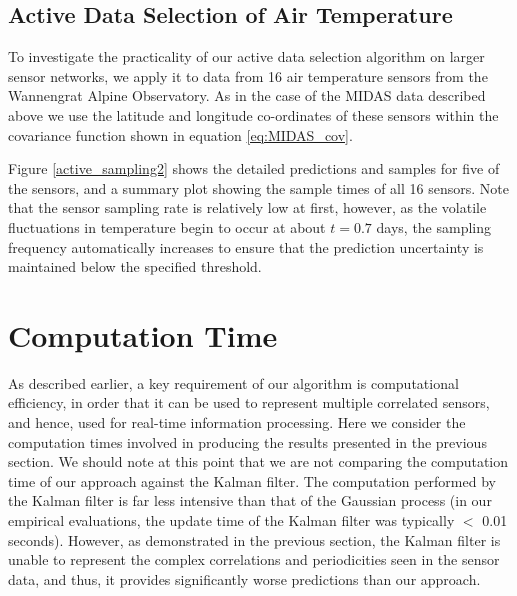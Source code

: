 \documentclass{acmtrans2m}
\begin{document}
\subsection{Active Data Selection of Air Temperature}

To investigate the practicality of our active data selection algorithm on larger sensor networks, we apply it to data from 16 air temperature sensors from the Wannengrat Alpine Observatory. As in the case of the MIDAS data described above we use the latitude and longitude co-ordinates of these sensors within the covariance function shown in equation \eqref{eq:MIDAS_cov}.

Figure \ref{active_sampling2} shows the detailed predictions and samples for five of the sensors, and a summary plot showing the sample times of all 16 sensors. Note that the sensor sampling rate is relatively low at first, however, as the volatile fluctuations in temperature begin to occur at about $t=0.7$ days, the sampling frequency automatically increases to ensure that the prediction uncertainty is maintained below the specified threshold.

\section{Computation Time}\label{sec_computation}

\noindent As described earlier, a key requirement of our algorithm is computational efficiency, in order that it can be used to represent multiple correlated sensors, and hence, used for real-time information processing. Here we consider the computation times involved in producing the results presented in the previous section. We should note at this point that we are not comparing the computation time of our approach against the Kalman filter. The computation performed by the Kalman filter is far less intensive than that of the Gaussian process (in our empirical evaluations, the update time of the Kalman filter was typically $<$ 0.01 seconds). However, as demonstrated in the previous section, the Kalman filter is unable to represent the complex correlations and periodicities seen in the sensor data, and thus, it provides significantly worse predictions than our approach.
\end{document}
